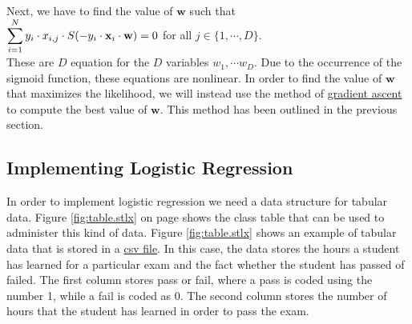 \colorbox{red}{} 
\\[0.2cm]
Next, we have to find the value of $\mathbf{w}$ such that
\\[0.2cm]
\hspace*{1.3cm}
$\displaystyle\sum\limits_{i=1}^N y_i \cdot x_{i,j} \cdot  S(-y_i \cdot \mathbf{x}_i \cdot \mathbf{w}) = 0$
\quad for all $j \in \{1, \cdots, D\}$.
\\[0.2cm]
These are $D$ equation for the $D$ variables $w_1, \cdots w_D$.  Due to the occurrence of the sigmoid function, these
equations are nonlinear.  In order to find the value of $\mathbf{w}$ that maximizes the likelihood, we will instead use
the method of \href{https://en.wikipedia.org/wiki/Gradient_descent}{gradient ascent} to compute
the best value of $\mathbf{w}$.  This method has been outlined in the previous section.

\subsection{Implementing Logistic Regression}
In order to implement logistic regression we need a data structure for tabular data.  Figure
\ref{fig:table.stlx} on page \pageref{fig:table.stlx} shows the class table that can be used to
administer this kind of data.  Figure \ref{fig:table.stlx}  shows an example of tabular data that is
stored in a \href{https://en.wikipedia.org/wiki/Comma-separated_values}{csv file}.  In this case,
the data stores the hours a student has learned for a particular exam and the fact whether the
student has passed of failed.  The first column stores pass or fail, where a pass is coded using the
number 1, while a fail is coded as 0.  The second column stores the number of hours that the student
has learned in order to pass the exam.

